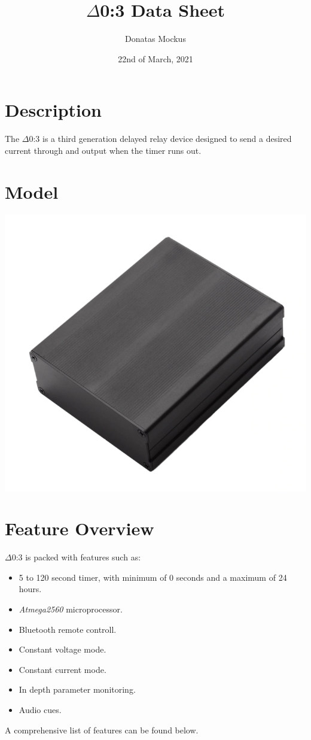 \documentclass{article}
\title{\textbf{$\Delta$0:3 Data Sheet}}
\author{Donatas Mockus}
\date{22nd of March, 2021}
\begin{document}
\maketitle

\begin{multicols}{2}
	\section{Description}
	The $\Delta$0:3 is a third generation delayed relay device designed to send a desired current through
	and output when the timer runs out.

	\section{Model}
	\begin{center}
		\includegraphics[scale=0.25]{model}
	\end{center}

	\columnbreak

	\section{Feature Overview}
	$\Delta$0:3 is packed with features such as:
	\begin{itemize}
		\item 5 to 120 second timer, with minimum of 0 seconds and a maximum of 24 hours.
		\item \textit{Atmega2560} microprocessor.
		\item Bluetooth remote controll.
		\item Constant voltage mode.
		\item Constant current mode.
		\item In depth parameter monitoring.
		\item Audio cues.
	\end{itemize}
	A comprehensive list of features can be found below.
\end{multicols}
\end{document}
